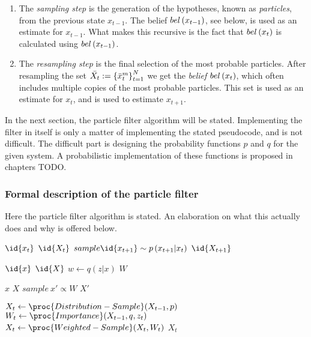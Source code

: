 \begin{enumerate}
\item The \emph{sampling step} is the generation of the hypotheses, known as \emph{particles}, from the previous state $x_{t-1}$. The belief $bel\left(x_{t-1}\right)$, see below, is used as an estimate for $x_{t-1}$. What makes this recursive is the fact that $bel\left(x_t\right)$ is calculated using $bel\left(x_{t-1}\right)$.

\item The \emph{resampling step} is the final selection of the most probable particles. After resampling the set $\bar{X_t} := \left\{\bar{x}_{t}^{m}\right\}_{t=1}^{N}$ we get the \emph{belief} $bel\left(x_t\right)$, which often includes multiple copies of the most probable particles. This set is used as an estimate for $x_t$, and is used to estimate $x_{t+1}$.
\end{enumerate}

In the next section, the particle filter algorithm will be stated. Implementing the filter in itself is only a matter of implementing the stated pseudocode, and is not difficult. The difficult part is designing the probability functions $p$ and $q$ for the given system. A probabilistic implementation of these functions is proposed in chapters TODO.


\subsubsection{Formal description of the particle filter}
Here the particle filter algorithm is stated. An elaboration on what this actually does and why is offered below.

\begin{codebox}
\li \ForEach $\id{x_t}$ \In $\id{X_t}$
\li     \Do
            $sample \id{x_{t+1}} \sim p\left(x_{t+1}|x_t\right)$
        \End
\li \Return $\id{X_{t+1}}$
\end{codebox}
\begin{codebox}
\li \ForEach $\id{x}$ \In $\id{X}$ 
\li     \Do
            $w \gets q\left(z|x\right)$
        \End
\li \Return $W$
\end{codebox}
\begin{codebox}
\li \ForEach $x$ \In $X$
\li     \Do
            $sample ~ x' \propto W$   
        \End
\li \Return $X'$
\end{codebox}
\begin{codebox}
\li $X_t \gets \proc{Distribution-Sample}(X_{t-1},p)$
\li $W_t \gets \proc{Importance}(X_{t-1},q,z_t)$
\li $X_t \gets \proc{Weighted-Sample}(X_t,W_t)$
\li \Return $X_t$
\end{codebox}

